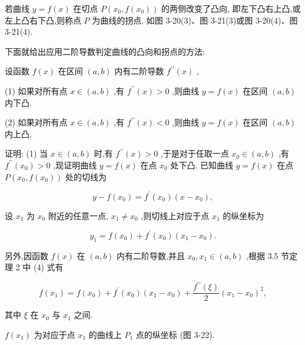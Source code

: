 \documentclass[lang=cn,newtx,10pt,scheme=chinese]{elegantbook}
\begin{document}
若曲线 \(y = f\left( x\right)\) 在切点 \(P\left( {{x}_{0},f\left( {x}_{0}\right) }\right)\) 的两侧改变了凸向, 即左下凸右上凸,或左上凸右下凸,则称点 \(P\) 为曲线的拐点. 如图 3-20(3)、图 3-21(3)或图 3-20(4)、图 3-21(4).

下面就给出应用二阶导数判定曲线的凸向和拐点的方法:

\begin{theorem}[定理]

设函数 \(f\left( x\right)\) 在区间 \(\left( {a,b}\right)\) 内有二阶导数 \({f}^{\prime \prime }\left( x\right)\) ,

(1) 如果对所有点 \(x \in \left( {a,b}\right)\) ,有 \({f}^{\prime \prime }\left( x\right) > 0\) ,则曲线 \(y = f\left( x\right)\) 在区间 \(\left( {a,b}\right)\) 内下凸.

(2) 如果对所有点 \(x \in \left( {a,b}\right)\) ,有 \({f}^{\prime \prime }\left( x\right) < 0\) ,则曲线 \(y = f\left( x\right)\) 在区间 \(\left( {a,b}\right)\) 内上凸.

\end{theorem}

证明: (1) 当 \(x \in \left( {a,b}\right)\) 时,有 \({f}^{\prime \prime }\left( x\right) > 0\) ,于是对于任取一点 \({x}_{0} \in \left( {a,b}\right)\) ,有 \({f}^{\prime \prime }\left( {x}_{0}\right) > 0\) ,现证明曲线 \(y = f\left( x\right)\) 在点 \({x}_{0}\) 处下凸. 已知曲线 \(y = f\left( x\right)\) 在点 \(P\left( {{x}_{0},f\left( {x}_{0}\right) }\right)\) 处的切线为

\[
y - f\left( {x}_{0}\right) = {f}^{\prime }\left( {x}_{0}\right) \left( {x - {x}_{0}}\right) ,
\]

设 \({x}_{1}\) 为 \({x}_{0}\) 附近的任意一点, \({x}_{1} \neq {x}_{0}\) ,则切线上对应于点 \({x}_{1}\) 的纵坐标为

\[
{y}_{1} = f\left( {x}_{0}\right) + {f}^{\prime }\left( {x}_{0}\right) \left( {{x}_{1} - {x}_{0}}\right) . \tag{1}
\]

另外,因函数 \(f\left( x\right)\) 在 \(\left( {a,b}\right)\) 内有二阶导数,并且 \({x}_{0},{x}_{1} \in \left( {a,b}\right)\) ,根据 3.5 节定理 2 中 (4) 式有

\[
f\left( {x}_{1}\right) = f\left( {x}_{0}\right) + {f}^{\prime }\left( {x}_{0}\right) \left( {{x}_{1} - {x}_{0}}\right) + \frac{{f}^{\prime \prime }\left( \xi \right) }{2}{\left( {x}_{1} - {x}_{0}\right) }^{2}, \tag{2}
\]

其中 \(\xi\) 在 \({x}_{0}\) 与 \({x}_{1}\) 之间.

\(f\left( {x}_{1}\right)\) 为对应于点 \({x}_{1}\) 的曲线上 \({P}_{1}\) 点的纵坐标 (图 3-22).
\end{document}
